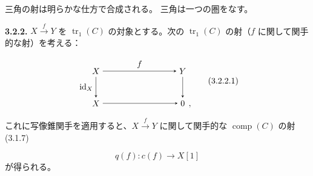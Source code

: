 三角の射は明らかな仕方で合成される。
三角は一つの圏をなす。

\noindent\textbf{3.2.2.}\quad
{}
$X\xrightarrow{f}Y$ を $\operatorname{tr}_1(C)$ の対象とする。次の
$\operatorname{tr}_1(C)$ の射（$f$ に関して関手的な射）を考える：

\begin{equation}
  \begin{tikzpicture}[>=stealth,baseline=(current bounding box.center)]
    \node (X)  at (0,1.35) {$X$};
    \node (Y)  at (3.6,1.35) {$Y$};
    \node (Xp) at (0,0) {$X$};
    \node (Z)  at (3.6,0) {$0$};
    \node[anchor=base west,inner sep=0pt,xshift=.08em] at (Z.base east) {$,$};
    \draw[->] (X) -- node[above] {$f$} (Y);
    \draw[->] (X) -- node[left] {$\operatorname{id}_X$} (Xp);
    \draw[->] (Y) -- (Z);
    \draw[->] (Xp) -- (Z);
  \end{tikzpicture}
  \tag{3.2.2.1}
\end{equation}

これに写像錐関手を適用すると、$X\xrightarrow{f}Y$ に関して関手的な
$\operatorname{comp}(C)$ の射 (3.1.7)

\begin{equation}
  q(f)\colon c(f)\longrightarrow X[1]
  \tag{3.2.2.2}
\end{equation}
が得られる。
